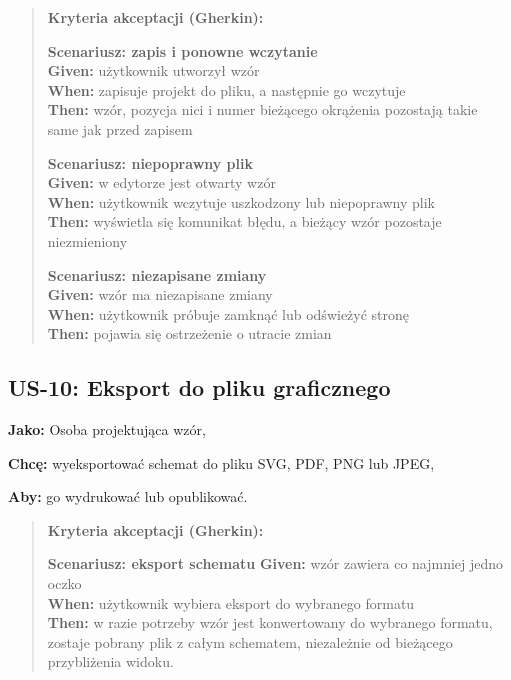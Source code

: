 \documentclass[a4paper,11pt]{article}
\begin{document}
\begin{quote}
\textbf{Kryteria akceptacji (Gherkin):}

\textbf{Scenariusz: zapis i ponowne wczytanie} \\
\textbf{Given:} użytkownik utworzył wzór \\
\textbf{When:} zapisuje projekt do pliku, a następnie go wczytuje \\
\textbf{Then:} wzór, pozycja nici i numer bieżącego okrążenia pozostają takie same jak przed zapisem

\textbf{Scenariusz: niepoprawny plik} \\
\textbf{Given:} w edytorze jest otwarty wzór \\
\textbf{When:} użytkownik wczytuje uszkodzony lub niepoprawny plik \\
\textbf{Then:} wyświetla się komunikat błędu, a bieżący wzór pozostaje niezmieniony

\textbf{Scenariusz: niezapisane zmiany} \\
\textbf{Given:} wzór ma niezapisane zmiany \\
\textbf{When:} użytkownik próbuje zamknąć lub odświeżyć stronę \\
\textbf{Then:} pojawia się ostrzeżenie o utracie zmian
\end{quote}

\subsection*{\textbf{US-10: Eksport do pliku graficznego}}

\noindent\textbf{Jako:} Osoba projektująca wzór,\par
\noindent\textbf{Chcę:} wyeksportować schemat do pliku SVG, PDF, PNG lub JPEG,\par
\noindent\textbf{Aby:} go wydrukować lub opublikować.\par

\begin{quote}
\textbf{Kryteria akceptacji (Gherkin):}

\textbf{Scenariusz: eksport schematu}
\textbf{Given:} wzór zawiera co najmniej jedno oczko \\
\textbf{When:} użytkownik wybiera eksport do wybranego formatu \\
\textbf{Then:} w razie potrzeby wzór jest konwertowany do wybranego formatu, zostaje pobrany plik z całym schematem, niezależnie od bieżącego przybliżenia widoku.
\end{quote}
\end{document}
